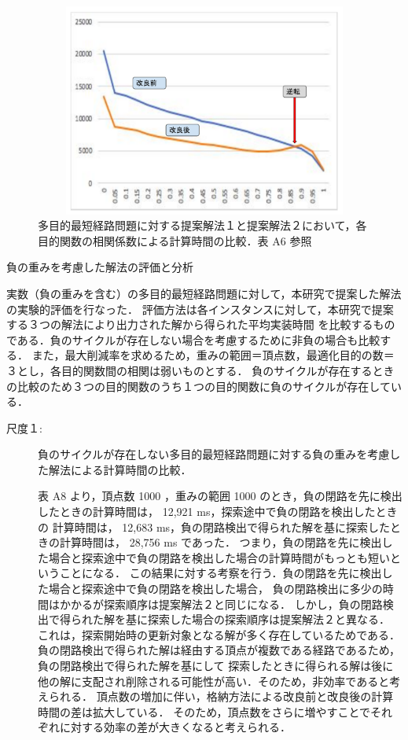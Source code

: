 \documentclass[12pt]{optlab-bachelor}
\begin{document}
\begin{figure}[htbp]
  \centering
  \includegraphics[height=7.0cm , width=15.0cm]{fig/fig18.pdf}
  \caption{多目的最短経路問題に対する提案解法１と提案解法２において，各目的関数の相関係数による計算時間の比較．表 A6 参照}
\end{figure}


\begin{description}
  \item[負の重みを考慮した解法の評価と分析]
\end{description}

実数（負の重みを含む）の多目的最短経路問題に対して，本研究で提案した解法の実験的評価を行なった．
評価方法は各インスタンスに対して，本研究で提案する３つの解法により出力された解から得られた平均実装時間
を比較するものである．負のサイクルが存在しない場合を考慮するために非負の場合も比較する．
また，最大削減率を求めるため，重みの範囲＝頂点数，最適化目的の数＝３とし，各目的関数間の相関は弱いものとする．
負のサイクルが存在するときの比較のため３つの目的関数のうち１つの目的関数に負のサイクルが存在している．

\begin{description}
  \item[尺度１:]
  負のサイクルが存在しない多目的最短経路問題に対する負の重みを考慮した解法による計算時間の比較．

  表 A8 より，頂点数 1000 ，重みの範囲 1000 のとき，負の閉路を先に検出したときの計算時間は， 12,921 ms，探索途中で負の閉路を検出したときの
  計算時間は， 12,683 ms，負の閉路検出で得られた解を基に探索したときの計算時間は， 28,756 ms であった．
  つまり，負の閉路を先に検出した場合と探索途中で負の閉路を検出した場合の計算時間がもっとも短いということになる．
  この結果に対する考察を行う．負の閉路を先に検出した場合と探索途中で負の閉路を検出した場合，
  負の閉路検出に多少の時間はかかるが探索順序は提案解法２と同じになる．
  しかし，負の閉路検出で得られた解を基に探索した場合の探索順序は提案解法２と異なる．
  これは，探索開始時の更新対象となる解が多く存在しているためである．
  負の閉路検出で得られた解は経由する頂点が複数である経路であるため，負の閉路検出で得られた解を基にして
  探索したときに得られる解は後に他の解に支配され削除される可能性が高い．そのため，非効率であると考えられる．
  頂点数の増加に伴い，格納方法による改良前と改良後の計算時間の差は拡大している．
  そのため，頂点数をさらに増やすことでそれぞれに対する効率の差が大きくなると考えられる．

\end{description}
\end{document}
